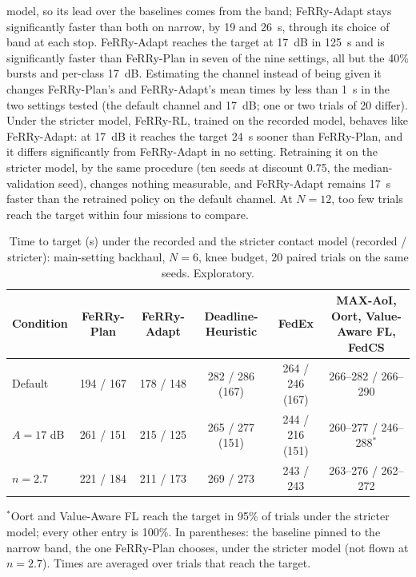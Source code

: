 \documentclass[conference]{IEEEtran}
\newcommand{\sysname}{FeRRy}
\begin{document}
{model, so its lead over the baselines comes from the band; \sysname{}-Adapt
stays significantly faster than both on narrow, by 19 and 26~s, through its
choice of band at each stop. \sysname{}-Adapt reaches the target
at 17~dB in 125~s and is significantly faster than \sysname{}-Plan in seven of
the nine settings, all but the 40\% bursts and per-class 17~dB. Estimating the
channel instead of being given it changes \sysname{}-Plan's and
\sysname{}-Adapt's mean times by less than 1~s in the two settings tested (the
default channel and 17~dB; one or two trials of 20 differ). Under the stricter
model, \sysname{}-RL, trained on the recorded model, behaves like
\sysname{}-Adapt: at 17~dB it reaches the target 24~s sooner than
\sysname{}-Plan, and it differs significantly from \sysname{}-Adapt in no
setting. Retraining it on the stricter model, by the same procedure (ten seeds
at discount 0.75, the median-validation seed), changes nothing measurable, and
\sysname{}-Adapt remains 17~s faster than the retrained policy on the default
channel. At \(N=12\), too few trials reach the target within four missions to
compare.}

\begin{table}[t]
\centering
\color{blue}
\caption{Time to target (s) under the recorded and the stricter contact model
(recorded / stricter): main-setting backhaul, \(N=6\), knee budget, 20 paired
trials on the same seeds. Exploratory.}
\label{tab:session}
\small
\setlength{\tabcolsep}{5pt}

\begin{tabular}{lccccc}
\hline
\textbf{Condition} &
\textbf{\sysname{}-Plan} &
\textbf{\sysname{}-Adapt} &
\textbf{Deadline-Heuristic} &
\textbf{FedEx} &
\textbf{MAX-AoI, Oort, Value-Aware FL, FedCS} \\
\hline
Default & 194 / 167 & 178 / 148 & 282 / 286 (167) & 264 / 246 (167) & 266--282 / 266--290 \\
\(A=17\) dB & 261 / 151 & 215 / 125 & 265 / 277 (151) & 244 / 216 (151) & 260--277 / 246--288\(^{\ast}\) \\
\(n=2.7\) & 221 / 184 & 211 / 173 & 269 / 273 & 243 / 243 & 263--276 / 262--272 \\
\hline
\end{tabular}

\vspace{2pt}
\footnotesize
\(^{\ast}\)Oort and Value-Aware FL reach the target in 95\% of trials under the
stricter model; every other entry is 100\%. In parentheses: the baseline pinned
to the narrow band, the one \sysname{}-Plan chooses, under the stricter model (not
flown at \(n=2.7\)). Times are averaged over trials that reach the target.
\end{table}
\end{document}
